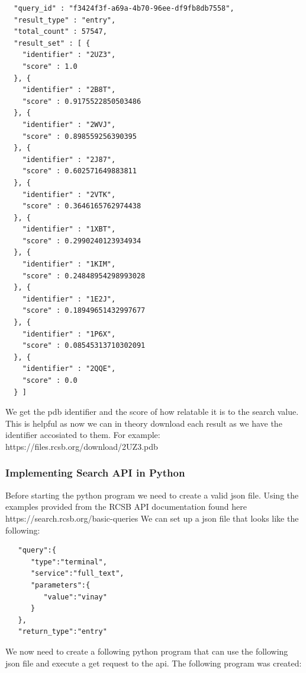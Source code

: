 \documentclass[]{final_report}
\begin{document}
\begin{lstlisting}
  "query_id" : "f3424f3f-a69a-4b70-96ee-df9fb8db7558",
  "result_type" : "entry",
  "total_count" : 57547,
  "result_set" : [ {
    "identifier" : "2UZ3",
    "score" : 1.0
  }, {
    "identifier" : "2B8T",
    "score" : 0.9175522850503486
  }, {
    "identifier" : "2WVJ",
    "score" : 0.898559256390395
  }, {
    "identifier" : "2J87",
    "score" : 0.602571649883811
  }, {
    "identifier" : "2VTK",
    "score" : 0.3646165762974438
  }, {
    "identifier" : "1XBT",
    "score" : 0.2990240123934934
  }, {
    "identifier" : "1KIM",
    "score" : 0.24848954298993028
  }, {
    "identifier" : "1E2J",
    "score" : 0.18949651432997677
  }, {
    "identifier" : "1P6X",
    "score" : 0.08545313710302091
  }, {
    "identifier" : "2QQE",
    "score" : 0.0
  } ]
\end{lstlisting}

We get the pdb identifier and the score of how relatable it is to the search value. This is helpful as now we can in theory download each result as we have the identifier accosiated to them. For example: https://files.rcsb.org/download/2UZ3.pdb

\subsubsection{Implementing Search API in Python}

Before starting the python program we need to create a valid json file. Using the examples provided from the RCSB API documentation found here https://search.rcsb.org/basic-queries We can set up a json file that looks like the following:

\begin{lstlisting}
   "query":{
      "type":"terminal",
      "service":"full_text",
      "parameters":{
         "value":"vinay"
      }
   },
   "return_type":"entry"
\end{lstlisting}

We now need to create a following python program that can use the following json file and execute a get request to the api. The following program was created: 
\end{document}
